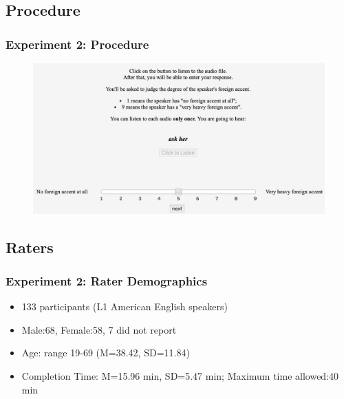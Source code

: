 \documentclass{beamer}
\begin{document}
\subsection{Procedure}
\begin{frame}
\frametitle{Experiment 2: Procedure}
\begin{figure}
\includegraphics[width=0.8\linewidth]{figures/results/exp2/exp2.jpg}
\end{figure}
\end{frame}
\subsection{Raters}
\begin{frame}
\frametitle{Experiment 2: Rater Demographics}
\begin{itemize}
\item {133 participants (L1 American English speakers)}\linebreak
\item {Male:68, Female:58, 7 did not report}\linebreak
\item {Age: range 19-69 (M=38.42, SD=11.84)}\linebreak
\item {Completion Time: M=15.96 min, SD=5.47 min; \linebreak Maximum time allowed:40 min}
\end{itemize}
\end{frame}
\end{document}

